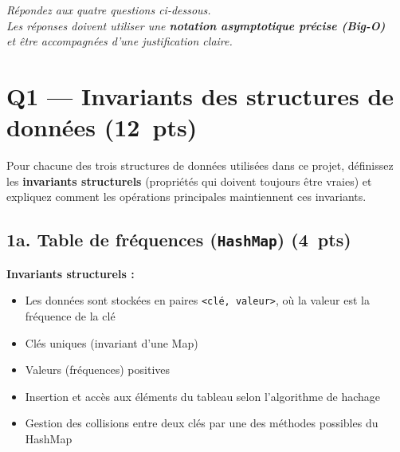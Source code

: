 \documentclass[12pt,a4paper]{article}
\newcommand{\jclass}[1]{\texttt{#1}}
\newcommand{\pts}[1]{\hfill\textbf{\small(#1~pts)}}
\begin{document}
\begin{titlepage}

  \vspace{5mm}
\end{titlepage}

\newpage

{\centering
  \textit{Répondez aux quatre questions ci-dessous.}\\
  \textit{Les réponses doivent utiliser une \textbf{notation asymptotique précise (Big-O)}}\\
  \textit{et être accompagnées d'une justification claire.}
\par}

\vspace{1.5em}

\section{Q1 — Invariants des structures de données \pts{12}}

Pour chacune des trois structures de données utilisées dans ce projet, définissez
les \textbf{invariants structurels} (propriétés qui doivent toujours être vraies)
et expliquez comment les opérations principales maintiennent ces invariants.

\subsection*{1a. Table de fréquences (\jclass{HashMap}) \pts{4}}

\textbf{Invariants structurels :}
\begin{itemize}
  \item Les données sont stockées en paires \texttt{<clé, valeur>}, où la valeur est la fréquence de la clé
  \item Clés uniques (invariant d'une Map)
  \item Valeurs (fréquences) positives
  \item Insertion et accès aux éléments du tableau selon l'algorithme de hachage
  \item Gestion des collisions entre deux clés par une des méthodes possibles du HashMap
\end{itemize}
\end{document}
